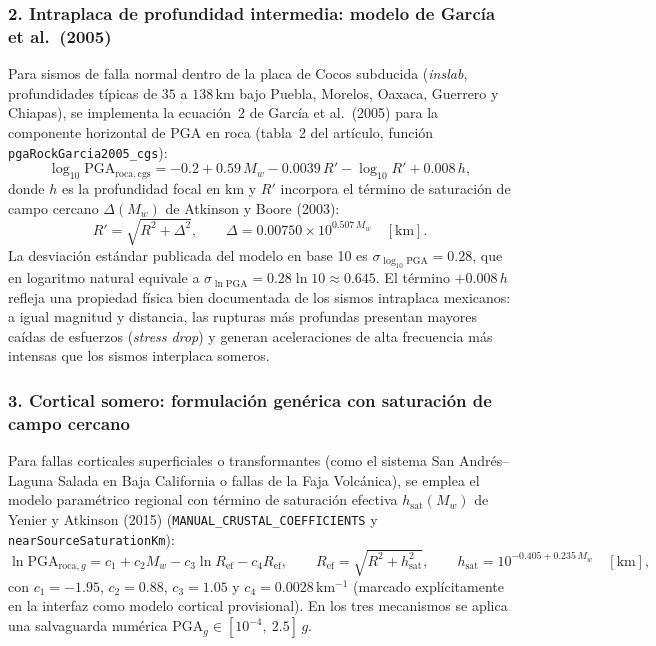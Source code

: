 \documentclass[11pt,a4paper]{article}
\newcommand{\unit}[1]{\mathrm{#1}}
\begin{document}
\subsubsection*{2. Intraplaca de profundidad intermedia: modelo de García et al.\ (2005)}
Para sismos de falla normal dentro de la placa de Cocos subducida (\emph{inslab}, profundidades típicas de $35$
a $138\,\unit{km}$ bajo Puebla, Morelos, Oaxaca, Guerrero y Chiapas), se implementa la ecuación~2 de García et
al.\ (2005) para la componente horizontal de $\mathrm{PGA}$ en roca (tabla~2 del artículo, función
\texttt{pgaRockGarcia2005\_cgs}):
\begin{equation}
  \log_{10}\mathrm{PGA}_{\mathrm{roca,cgs}}
  = -0.2 + 0.59\,M_w - 0.0039\,R' - \log_{10} R' + 0.008\,h,
  \label{eq:gmpe-garcia}
\end{equation}
donde $h$ es la profundidad focal en $\unit{km}$ y $R'$ incorpora el término de saturación de campo cercano
$\Delta(M_w)$ de Atkinson y Boore (2003):
\begin{equation}
  R' = \sqrt{R^2 + \Delta^2},
  \qquad
  \Delta = 0.00750\times 10^{0.507\,M_w}\quad[\unit{km}].
  \label{eq:saturacion-garcia}
\end{equation}
La desviación estándar publicada del modelo en base 10 es $\sigma_{\log_{10}\mathrm{PGA}} = 0.28$, que en
logaritmo natural equivale a $\sigma_{\ln\mathrm{PGA}} = 0.28\ln 10 \approx 0.645$. El término $+0.008\,h$
refleja una propiedad física bien documentada de los sismos intraplaca mexicanos: a igual magnitud y distancia,
las rupturas más profundas presentan mayores caídas de esfuerzos (\emph{stress drop}) y generan aceleraciones
de alta frecuencia más intensas que los sismos interplaca someros.

\subsubsection*{3. Cortical somero: formulación genérica con saturación de campo cercano}
Para fallas corticales superficiales o transformantes (como el sistema San Andrés--Laguna Salada en Baja
California o fallas de la Faja Volcánica), se emplea el modelo paramétrico regional con término de saturación
efectiva $h_{\mathrm{sat}}(M_w)$ de Yenier y Atkinson (2015) (\texttt{MANUAL\_CRUSTAL\_COEFFICIENTS} y
\texttt{nearSourceSaturationKm}):
\begin{equation}
  \ln\mathrm{PGA}_{\mathrm{roca},g}
  = c_1 + c_2 M_w - c_3\ln R_{\mathrm{ef}} - c_4 R_{\mathrm{ef}},
  \qquad
  R_{\mathrm{ef}} = \sqrt{R^2 + h_{\mathrm{sat}}^2},
  \qquad
  h_{\mathrm{sat}} = 10^{-0.405 + 0.235\,M_w}\quad[\unit{km}],
  \label{eq:gmpe-cortical}
\end{equation}
con $c_1 = -1.95$, $c_2 = 0.88$, $c_3 = 1.05$ y $c_4 = 0.0028\,\unit{km^{-1}}$ (marcado explícitamente en la
interfaz como modelo cortical provisional). En los tres mecanismos se aplica una salvaguarda numérica
$\mathrm{PGA}_g \in [10^{-4},\ 2.5]\,g$.
\end{document}
